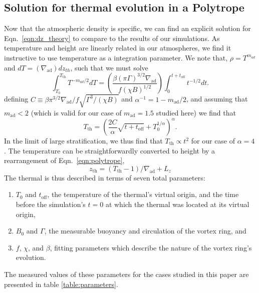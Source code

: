 \documentclass[twocolumn, amsmath, amsfonts, amssymb, trackchanges]{aastex62}
\newcommand{\grad}{\ensuremath{\nabla}}
\begin{document}
\subsection{Solution for thermal evolution in a Polytrope}
Now that the atmospheric density is specific, we can find an explicit solution for Eqn.~\ref{eqn:dz_theory} to compare to the results of our simulations. 
As temperature and height are linearly related in our atmospheres, we find it instructive to use temperature as a integration parameter.
We note that, $\rho = T^{m_{ad}}$ and $dT = (\grad_{\text{ad}}) dz_{th}$, such that we must solve 
\begin{equation}
\int_{T_0}^{T_{\text{th}}} T^{-m_{ad}/2} dT 
= \left(\frac{\beta(\pi\Gamma)^{3/2}\grad_{\text{ad}}}{f(\chi B)^{1/2}}\right)
\int_{0}^{t + t_{\text{off}}} t^{-1/2} dt.
\end{equation}
defining $C \equiv \beta \pi^{3/2} \grad_{\text{ad}} / f \sqrt{\Gamma^3/(\chi B)}$ and $\alpha^{-1} = 1 - m_{\text{ad}}/2$, and assuming that $m_{\text{ad}} < 2$ (which is valid for our case of $m_{\text{ad}} = 1.5$ studied here) we find that
\begin{equation}
T_{\text{th}} = \left(\frac{2C}{ \alpha } \sqrt{t + t_{\text{off}}} + T_0^{1/\alpha}  \right)^{\alpha}.
\label{eqn:theory_T}
\end{equation}
In the limit of large stratification, we thus find that $T_{\text{th}} \propto t^2$ for our case of $\alpha = 4$. 
The temperature can be straightforwardly converted to height by a rearrangement of Eqn.~\ref{eqn:polytrope},
\begin{equation}
z_{\text{th}} = (T_{\text{th}} - 1)/\grad_{\text{ad}} + L_z
\end{equation}
The thermal is thus described in terms of seven total parameters:
\begin{enumerate}
\item $T_0$ and $t_{\text{off}}$, the temperature of the thermal's virtual origin, and the time before the simulation's $t = 0$ at which the thermal was located at its virtual origin,
\item $B_0$ and $\Gamma$, the measurable buoyancy and circulation of the vortex ring, and
\item $f$, $\chi$, and $\beta$, fitting parameters which describe the nature of the vortex ring's evolution.
\end{enumerate}
The measured values of these parameters for the cases studied in this paper are presented in table \ref{table:parameters}.
\end{document}
